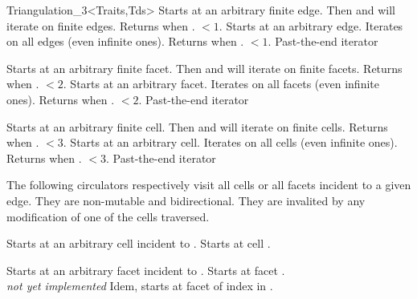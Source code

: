 \begin{ccClassTemplate}{Triangulation_3<Traits,Tds>}
{Starts at an arbitrary finite edge. Then \ccc{++} and \ccc{--} will
iterate on finite edges. Returns  when
\ccVar. $<1$.} 
\ccGlue
{}
{Starts at an arbitrary edge. Iterates on all edges (even infinite
ones). Returns  when \ccVar. $<1$.}
\ccGlue
{}
{Past-the-end iterator}

{Starts at an arbitrary finite facet. Then \ccc{++} and \ccc{--} will
iterate on finite facets. Returns  when
\ccVar. $<2$.}
\ccGlue
{}
{Starts at an arbitrary facet. Iterates on all facets (even infinite
ones). Returns  when 
\ccVar. $<2$.}
\ccGlue
{}
{Past-the-end iterator}

{Starts at an arbitrary finite cell. Then \ccc{++} and \ccc{--} will
iterate on finite cells. Returns  when
\ccVar. $<3$.}
\ccGlue
{}
{Starts at an arbitrary cell. Iterates on all cells (even infinite
ones). Returns  when 
\ccVar. $<3$.}
\ccGlue
{}
{Past-the-end iterator}


The following circulators respectively visit all cells or all facets
incident to a given edge. They are non-mutable and bidirectional. They
are invalited by any modification of one of the cells traversed. 

{Starts at an arbitrary cell incident to .
}
\ccGlue
{}
{Starts at cell .
}

{Starts at an arbitrary facet incident to .}
\ccGlue
{}
{Starts at facet . 
\\ 
\textit{not yet implemented}}
\ccGlue
{}
{Idem, starts at facet of index  in .
}


\end{ccClassTemplate}

